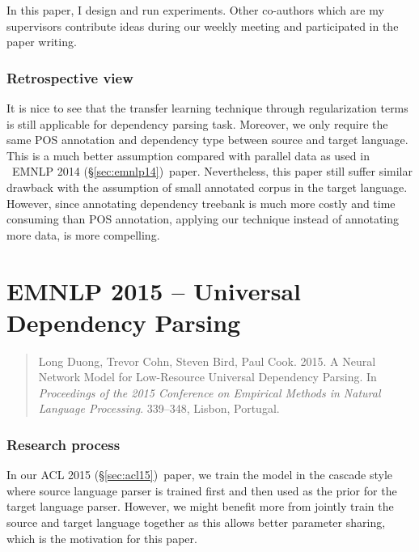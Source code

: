 \documentclass[12pt,twoside,final,hidelinks]{ltthesis}
\theoremstyle{definition}
\newcommand\emnlpiv{EMNLP 2014 (\S\ref{sec:emnlp14})}
\newcommand\aclv{ACL 2015 (\S\ref{sec:acl15})}
\begin{document}
In this paper, I design and run experiments. Other co-authors which are my supervisors contribute ideas during our weekly 
meeting and participated in the paper writing. 

\subsubsection{Retrospective view}
It is nice to see that the transfer learning technique through regularization terms is still applicable for dependency parsing task. Moreover, we only 
require the same POS annotation and dependency type between source and target language. This is a much better 
assumption compared with parallel data as used in ~\emnlpiv\ paper. Nevertheless, this paper still suffer similar drawback with the assumption of 
small annotated corpus in the target language. However, since annotating dependency treebank is much more costly and time consuming than POS annotation, 
applying our technique instead of annotating more data, is more compelling.  






\section{EMNLP 2015 -- Universal Dependency Parsing}
\label{sec:emnlp15}
\begin{quote}
Long Duong, Trevor Cohn, Steven Bird, Paul Cook. 2015. A Neural Network Model for Low-Resource Universal Dependency Parsing. In \textit{Proceedings of the 2015 Conference on Empirical Methods in Natural Language Processing}. 339--348, Lisbon, Portugal.
\end{quote}

\subsubsection{Research process}
In our \aclv\ paper, we train the model in the cascade style where source language parser is trained first and then used as the prior for the target language 
parser. However, we might benefit more from jointly train the source and target language together as this allows better 
parameter sharing, which is the motivation for this paper. 
\end{document}
